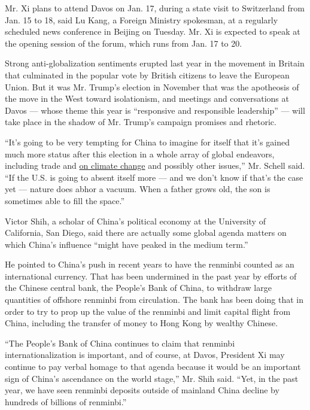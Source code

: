 Mr. Xi plans to attend Davos on Jan. 17, during a state visit to
Switzerland from Jan. 15 to 18, said Lu Kang, a Foreign Ministry
spokesman, at a regularly scheduled news conference in Beijing on
Tuesday. Mr. Xi is expected to speak at the opening session of the
forum, which runs from Jan. 17 to 20.

Strong anti-globalization sentiments erupted last year in the movement
in Britain that culminated in the popular vote by British citizens to
leave the European Union. But it was Mr. Trump's election in November
that was the apotheosis of the move in the West toward isolationism, and
meetings and conversations at Davos --- whose theme this year is
``responsive and responsible leadership'' --- will take place in the
shadow of Mr. Trump's campaign promises and rhetoric.

``It's going to be very tempting for China to imagine for itself that
it's gained much more status after this election in a whole array of
global endeavors, including trade and
\href{https://www.nytimes3xbfgragh.onion/2017/01/10/world/asia/china-wants-to-be-a-climate-change-watchdog-but-cant-yet-lead-by-example.html}{on
climate change} and possibly other issues,'' Mr. Schell said. ``If the
U.S. is going to absent itself more --- and we don't know if that's the
case yet --- nature does abhor a vacuum. When a father grows old, the
son is sometimes able to fill the space.''

Victor Shih, a scholar of China's political economy at the University of
California, San Diego, said there are actually some global agenda
matters on which China's influence ``might have peaked in the medium
term.''

He pointed to China's push in recent years to have the renminbi counted
as an international currency. That has been undermined in the past year
by efforts of the Chinese central bank, the People's Bank of China, to
withdraw large quantities of offshore renminbi from circulation. The
bank has been doing that in order to try to prop up the value of the
renminbi and limit capital flight from China, including the transfer of
money to Hong Kong by wealthy Chinese.

``The People's Bank of China continues to claim that renminbi
internationalization is important, and of course, at Davos, President Xi
may continue to pay verbal homage to that agenda because it would be an
important sign of China's ascendance on the world stage,'' Mr. Shih
said. ``Yet, in the past year, we have seen renminbi deposits outside of
mainland China decline by hundreds of billions of renminbi.''

